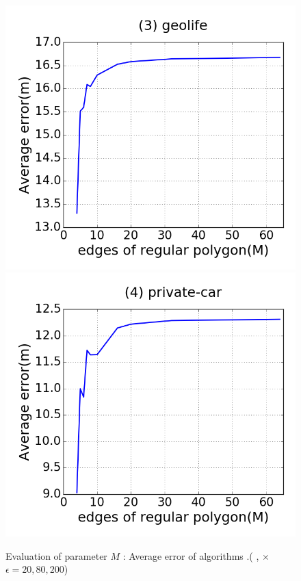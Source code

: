 {\begin{figure}[tb!]
\includegraphics[scale = 0.25]{figures/Exp-M-error-geolife.png}
\includegraphics[scale = 0.25]{figures/Exp-M-error-private.png}
\vspace{-2ex}
\caption{\small Evaluation of parameter $M$ : Average error of algorithms \cista.( \rpia, \cpia $\times$ $\epsilon = 20, 80, 200$)}
\label{fig:m-error-cista}
\vspace{-1ex}
\end{figure}
}


